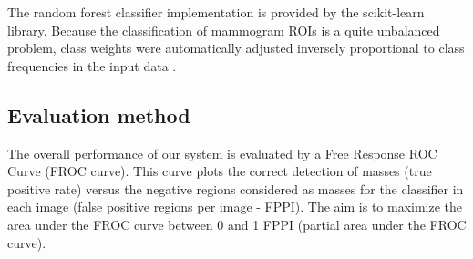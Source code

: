 The random forest classifier implementation is provided by the scikit-learn library. Because the classification of mammogram ROIs is a quite unbalanced problem, class weights were automatically adjusted inversely proportional to class frequencies in the input data \cite{Pedregosa2011}.


\subsection{Evaluation method}
The overall performance of our system is evaluated by a Free Response ROC Curve (FROC curve). This curve plots the correct detection of masses (true positive rate) versus the negative regions considered as masses for the classifier in each image (false positive regions per image - FPPI). The aim is to maximize the area under the FROC curve between 0 and 1 FPPI (partial area under the FROC curve).\par
